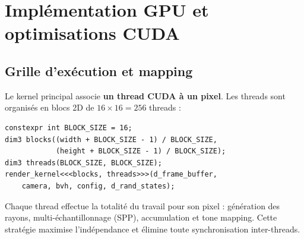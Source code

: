 \documentclass[12pt,a4paper]{article}
\begin{document}
\section{Impl\'{e}mentation GPU et optimisations CUDA}

\subsection{Grille d'ex\'{e}cution et mapping}

Le kernel principal associe \textbf{un thread CUDA \`{a} un pixel}. Les threads sont organis\'{e}s en blocs 2D de $16 \times 16 = 256$ threads :

\begin{lstlisting}[caption={Lancement du kernel de rendu}]
constexpr int BLOCK_SIZE = 16;
dim3 blocks((width + BLOCK_SIZE - 1) / BLOCK_SIZE,
            (height + BLOCK_SIZE - 1) / BLOCK_SIZE);
dim3 threads(BLOCK_SIZE, BLOCK_SIZE);
render_kernel<<<blocks, threads>>>(d_frame_buffer,
    camera, bvh, config, d_rand_states);
\end{lstlisting}

Chaque thread effectue la totalit\'{e} du travail pour son pixel : g\'{e}n\'{e}ration des rayons, multi-\'{e}chantillonnage (SPP), accumulation et tone mapping. Cette strat\'{e}gie maximise l'ind\'{e}pendance et \'{e}limine toute synchronisation inter-threads.
\end{document}
